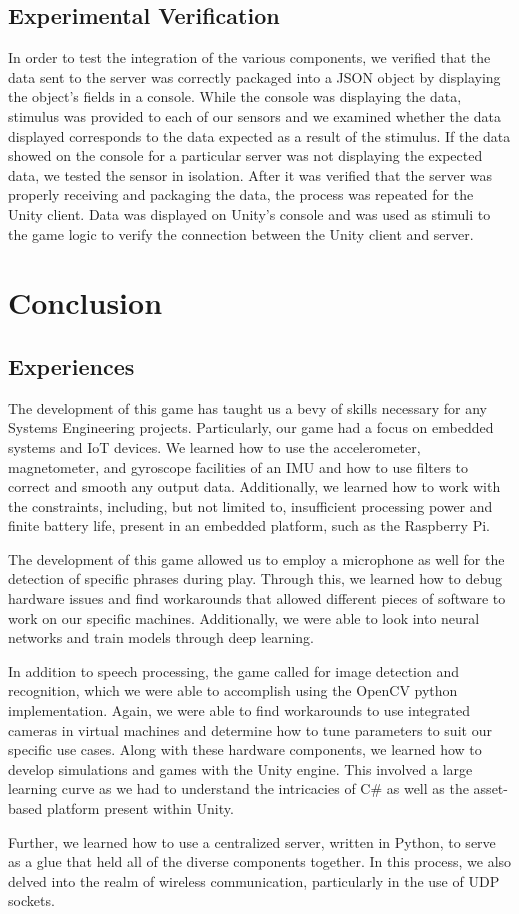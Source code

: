 \documentclass[titlepage, 12pt]{scrartcl}
\begin{document}
    \subsection{Experimental Verification}
        In order to test the integration of the various components, we verified that the data sent to the server was correctly packaged into a JSON object by displaying the object's fields in a console. While the console was displaying the data, stimulus was provided to each of our sensors and we examined whether the data displayed corresponds to the data expected as a result of the stimulus. If the data showed on the console for a particular server was not displaying the expected data, we tested the sensor in isolation. After it was verified that the server was properly receiving and packaging the data, the process was repeated for the Unity client. Data was displayed on Unity's console and was used as stimuli to the game logic to verify the connection between the Unity client and server.
    
\section{Conclusion}
    \subsection{Experiences}
        The development of this game has taught us a bevy of skills necessary for any Systems Engineering projects. Particularly, our game had a focus on embedded systems and IoT devices. We learned how to use the accelerometer, magnetometer, and gyroscope facilities of an IMU and how to use filters to correct and smooth any output data. Additionally, we learned how to work with the constraints, including, but not limited to, insufficient processing power and finite battery life, present in an embedded platform, such as the Raspberry Pi. \par
        The development of this game allowed us to employ a microphone as well for the detection of specific phrases during play. Through this, we learned how to debug hardware issues and find workarounds that allowed different pieces of software to work on our specific machines. Additionally, we were able to look into neural networks and train models through deep learning. \par
        In addition to speech processing, the game called for image detection and recognition, which we were able to accomplish using the OpenCV python implementation. Again, we were able to find workarounds to use integrated cameras in virtual machines and determine how to tune parameters to suit our specific use cases.
        Along with these hardware components, we learned how to develop simulations and games with the Unity engine. This involved a large learning curve as we had to understand the intricacies of C\# as well as the asset-based platform present within Unity. \par
        Further, we learned how to use a centralized server, written in Python, to serve as a glue that held all of the diverse components together. In this process, we also delved into the realm of wireless communication, particularly in the use of UDP sockets. \par
\end{document}
